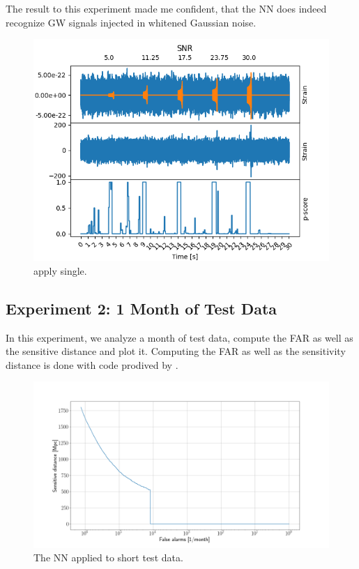 The result to this experiment made me confident, that the NN does indeed
recognize GW signals injected in whitened Gaussian noise.

\begin{figure}[ht]
  \includegraphics[width=\textwidth]{img/4_results/apply_single.png}
  \caption{apply single.}
  \label{fig:4_apply_single}
  \centering
\end{figure}

\subsection{Experiment 2: 1 Month of Test Data}
In this experiment, we analyze a month of test data, compute the FAR as well as
the sensitive distance and plot it. Computing the FAR as well as the
sensitivity distance is done with code prodived by \cite{MLGWSC1}.

\begin{figure}[ht]
  \includegraphics[width=\textwidth]{img/4_results/sensitivity_plot.png}
  \caption{The NN applied to short test data.}
  \label{fig:4_sensitivity_plot}
  \centering
\end{figure}

